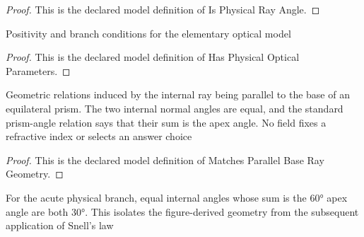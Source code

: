 \begin{proof}
  This is the declared model definition of Is Physical Ray Angle.
\end{proof}
\begin{definition}
  \label{def:physics:phyx-mini-0074:phyxminiproblems-problemphyxmini0074-hasphysicalopticalparameters}
  Positivity and branch conditions for the elementary optical model
\end{definition}
\begin{proof}
  This is the declared model definition of Has Physical Optical Parameters.
\end{proof}
\begin{definition}
  \label{def:physics:phyx-mini-0074:phyxminiproblems-problemphyxmini0074-matchesparallelbaseraygeometry}
  Geometric relations induced by the internal ray being parallel to the base of an equilateral prism. The two internal normal angles are equal, and the standard prism-angle relation says that their sum is the apex angle. No field fixes a refractive index or selects an answer choice
\end{definition}
\begin{proof}
  This is the declared model definition of Matches Parallel Base Ray Geometry.
\end{proof}
\begin{theorem}
  \label{thm:physics:phyx-mini-0074:phyxminiproblems-problemphyxmini0074-internalinterfaceanglesarethirtydegrees}
  For the acute physical branch, equal internal angles whose sum is the 60° apex angle are both 30°. This isolates the figure-derived geometry from the subsequent application of Snell's law
\end{theorem}
